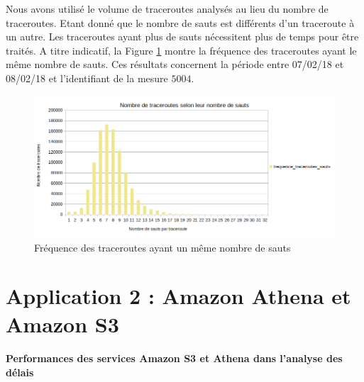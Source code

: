 


Nous avons utilisé le volume de traceroutes analysés au lieu du nombre de traceroutes.  Etant donné que le nombre de sauts est différents d'un traceroute à un autre. Les traceroutes ayant plus de sauts nécessitent plus de temps pour être traités. A titre indicatif, la Figure \ref{fig:frequencesauttraceroutes} montre la fréquence des traceroutes ayant le même nombre de sauts. Ces résultats concernent la période entre 07/02/18  et 08/02/18 et l'identifiant de la mesure $ 5004 $.

\begin{figure}[h]
	\centering
	\includegraphics[width=\linewidth]{illustrations/frequencesauttraceroutes2}
	\caption{Fréquence des traceroutes ayant un même nombre de sauts}
	\label{fig:frequencesauttraceroutes}
\end{figure}


\section{Application 2 : Amazon Athena et Amazon S3} 

\paragraph{Performances des services Amazon S3 et Athena dans l'analyse des délais }~ \label{aws-perforsm}


